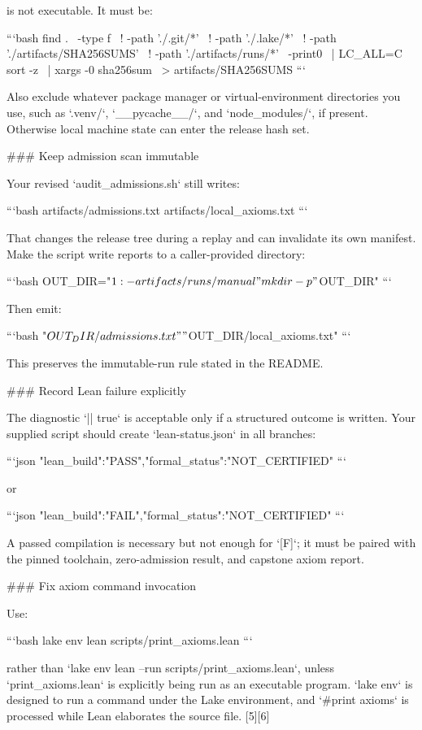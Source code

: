 is not executable. It must be:

```bash
find . \
  -type f \
  ! -path './.git/*' \
  ! -path './.lake/*' \
  ! -path './artifacts/SHA256SUMS' \
  ! -path './artifacts/runs/*' \
  -print0 \
| LC_ALL=C sort -z \
| xargs -0 sha256sum \
> artifacts/SHA256SUMS
```

Also exclude whatever package manager or virtual-environment directories you use, such as `.venv/`, `__pycache__/`, and `node_modules/`, if present. Otherwise local machine state can enter the release hash set.

### Keep admission scan immutable

Your revised `audit_admissions.sh` still writes:

```bash
artifacts/admissions.txt
artifacts/local_axioms.txt
```

That changes the release tree during a replay and can invalidate its own manifest. Make the script write reports to a caller-provided directory:

```bash
OUT_DIR="${1:-artifacts/runs/manual}"
mkdir -p "$OUT_DIR"
```

Then emit:

```bash
"$OUT_DIR/admissions.txt"
"$OUT_DIR/local_axioms.txt"
```

This preserves the immutable-run rule stated in the README.

### Record Lean failure explicitly

The diagnostic `|| true` is acceptable only if a structured outcome is written. Your supplied script should create `lean-status.json` in all branches:

```json
{"lean_build":"PASS","formal_status":"NOT_CERTIFIED"}
```

or

```json
{"lean_build":"FAIL","formal_status":"NOT_CERTIFIED"}
```

A passed compilation is necessary but not enough for `[F]`; it must be paired with the pinned toolchain, zero-admission result, and capstone axiom report.

### Fix axiom command invocation

Use:

```bash
lake env lean scripts/print_axioms.lean
```

rather than `lake env lean --run scripts/print_axioms.lean`, unless `print_axioms.lean` is explicitly being run as an executable program. `lake env` is designed to run a command under the Lake environment, and `#print axioms` is processed while Lean elaborates the source file. [5][6]

